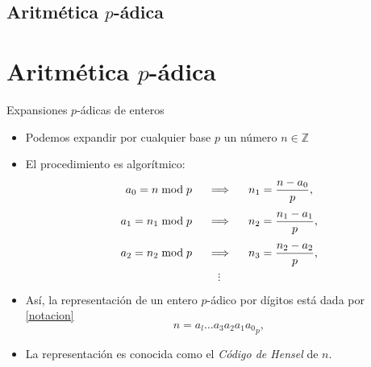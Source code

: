 \documentclass{beamer}
\theoremstyle{definition}
\numberwithin{equation}{section}
\renewcommand{\leq}{\leqslant}
\newcommand{\Z}{\mathbb{Z}}
\newcommand{\pnorm}[1]{\|#1\|_p}
\begin{document}

\subsection{Aritmética $p$-ádica}
\section*{Aritmética $p$-ádica}
\begin{frame}{Expansiones $p$-ádicas de enteros}
	\begin{itemize}[<+- | alert@+>]
		\item Podemos expandir por cualquier base $p$ un número $n\in\Z$
		\item El procedimiento es algorítmico:
		$$a_0 =n\bmod p\hspace{5mm} \Longrightarrow \hspace{5mm} n_1 = \frac{n-a_0}{p},$$ $$a_1 =n_1\bmod p \hspace{5mm} \Longrightarrow \hspace{5mm} n_2 = \frac{n_1-a_1}{p},$$ $$a_2 =n_2\bmod p \hspace{5mm} \Longrightarrow \hspace{5mm} n_3 = \frac{n_2-a_2}{p},$$
		$$\vdots$$
		\item Así, la representación de un entero $p$-ádico por dígitos está dada por \ref{notacion}
		$$n={ a_{l} \ldots a_{3} a_{2} a_{1} a_{0}}_p,$$
		\item La representación es conocida como el \textit{Código de Hensel} de $n$.
	\end{itemize}
\end{frame}
\end{document}
